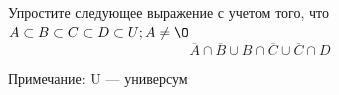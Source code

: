\question
Упростите следующее выражение с учетом того, что $A\subset B \subset C \subset D \subset U; A \neq \O$
\begin{equation*}
\overline{A} \cap \overline{B} \cup B \cap \overline{C} \cup \overline{C} \cap D
\end{equation*}

Примечание: U — универсум